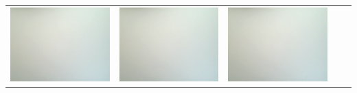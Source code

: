 \begin{tabular}{c c c c c}
\includegraphics[scale=0.11]{media/weissbilder/weissbild_5.png}
 & 
\includegraphics[scale=0.11]{media/weissbilder/weissbild_6.png}
 & 
\includegraphics[scale=0.11]{media/weissbilder/weissbild_7.png}

\end{tabular}
